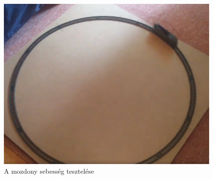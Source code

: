 \documentclass[a4paper,12pt]{article}
\begin{document}
\begin{figure}[htp]
\begin{minipage}{0.32\textwidth}
        \includegraphics[width=\linewidth]{images/tm_moving_3.png}
    \end{minipage}
    \caption[TM teszt]{A mozdony sebesség tesztelése}
    \label{fig:tmtest}
\end{figure}
\end{document}
